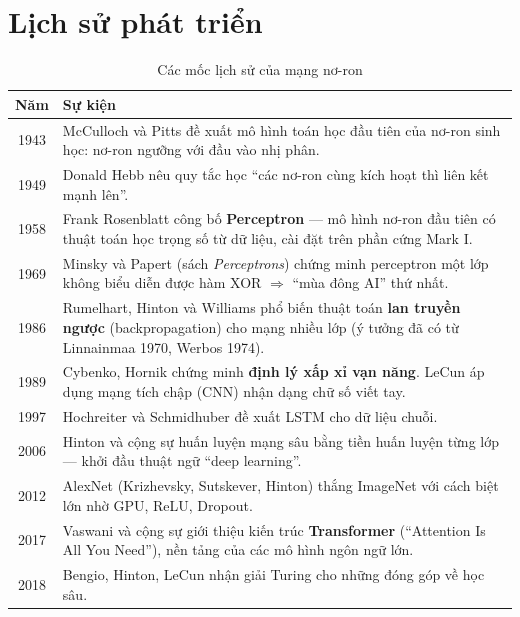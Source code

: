 \section{Lịch sử phát triển}

\begin{table}[H]
\centering
\begin{tabular}{|c|p{11.5cm}|}
\hline
\textbf{Năm} & \textbf{Sự kiện} \\
\hline
1943 & McCulloch và Pitts đề xuất mô hình toán học đầu tiên của nơ-ron sinh học: nơ-ron ngưỡng với đầu vào nhị phân. \\ \hline
1949 & Donald Hebb nêu quy tắc học ``các nơ-ron cùng kích hoạt thì liên kết mạnh lên''. \\ \hline
1958 & Frank Rosenblatt công bố \textbf{Perceptron} --- mô hình nơ-ron đầu tiên có thuật toán học trọng số từ dữ liệu, cài đặt trên phần cứng Mark I. \\ \hline
1969 & Minsky và Papert (sách \textit{Perceptrons}) chứng minh perceptron một lớp không biểu diễn được hàm XOR $\Rightarrow$ ``mùa đông AI'' thứ nhất. \\ \hline
1986 & Rumelhart, Hinton và Williams phổ biến thuật toán \textbf{lan truyền ngược} (backpropagation) cho mạng nhiều lớp (ý tưởng đã có từ Linnainmaa 1970, Werbos 1974). \\ \hline
1989 & Cybenko, Hornik chứng minh \textbf{định lý xấp xỉ vạn năng}. LeCun áp dụng mạng tích chập (CNN) nhận dạng chữ số viết tay. \\ \hline
1997 & Hochreiter và Schmidhuber đề xuất LSTM cho dữ liệu chuỗi. \\ \hline
2006 & Hinton và cộng sự huấn luyện mạng sâu bằng tiền huấn luyện từng lớp --- khởi đầu thuật ngữ ``deep learning''. \\ \hline
2012 & AlexNet (Krizhevsky, Sutskever, Hinton) thắng ImageNet với cách biệt lớn nhờ GPU, ReLU, Dropout. \\ \hline
2017 & Vaswani và cộng sự giới thiệu kiến trúc \textbf{Transformer} (``Attention Is All You Need''), nền tảng của các mô hình ngôn ngữ lớn. \\ \hline
2018 & Bengio, Hinton, LeCun nhận giải Turing cho những đóng góp về học sâu. \\ \hline
\end{tabular}
\caption{Các mốc lịch sử của mạng nơ-ron}
\end{table}

